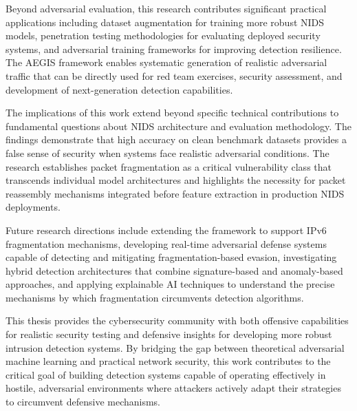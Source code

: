 Beyond adversarial evaluation, this research contributes significant practical applications including dataset augmentation for training more robust NIDS models, penetration testing methodologies for evaluating deployed security systems, and adversarial training frameworks for improving detection resilience. The AEGIS framework enables systematic generation of realistic adversarial traffic that can be directly used for red team exercises, security assessment, and development of next-generation detection capabilities.

The implications of this work extend beyond specific technical contributions to fundamental questions about NIDS architecture and evaluation methodology. The findings demonstrate that high accuracy on clean benchmark datasets provides a false sense of security when systems face realistic adversarial conditions. The research establishes packet fragmentation as a critical vulnerability class that transcends individual model architectures and highlights the necessity for packet reassembly mechanisms integrated before feature extraction in production NIDS deployments.

Future research directions include extending the framework to support IPv6 fragmentation mechanisms, developing real-time adversarial defense systems capable of detecting and mitigating fragmentation-based evasion, investigating hybrid detection architectures that combine signature-based and anomaly-based approaches, and applying explainable AI techniques to understand the precise mechanisms by which fragmentation circumvents detection algorithms.

This thesis provides the cybersecurity community with both offensive capabilities for realistic security testing and defensive insights for developing more robust intrusion detection systems. By bridging the gap between theoretical adversarial machine learning and practical network security, this work contributes to the critical goal of building detection systems capable of operating effectively in hostile, adversarial environments where attackers actively adapt their strategies to circumvent defensive mechanisms. 